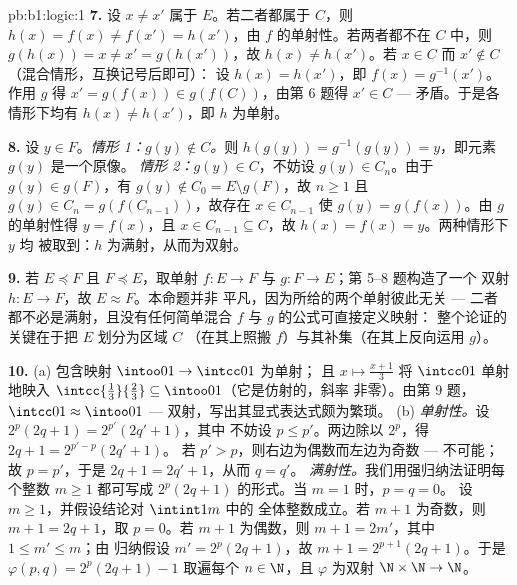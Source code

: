 \begin{solution}{pb:b1:logic:1}
\textbf{7.} 设 $x \neq x'$ 属于 $E$。若二者都属于 $C$，则 $h(x) =
f(x) \neq f(x') = h(x')$，由 $f$ 的单射性。若两者都不在
$C$ 中，则 $g(h(x)) = x \neq x' = g(h(x'))$，故 $h(x) \neq h(x')$。若
$x \in C$ 而 $x' \notin C$（混合情形，互换记号后即可）：
设 $h(x) = h(x')$，即 $f(x) = g^{-1}(x')$。作用 $g$ 得
$x' = g(f(x)) \in g(f(C))$，由第 6 题得 $x' \in C$ ---
矛盾。于是各情形下均有 $h(x) \neq h(x')$，即 $h$ 为单射。

\textbf{8.} 设 $y \in F$。\emph{情形 1：$g(y) \notin C$。}则
$h(g(y)) = g^{-1}(g(y)) = y$，即元素 $g(y)$ 是一个原像。
\emph{情形 2：$g(y) \in C$}，不妨设 $g(y) \in C_n$。由于 $g(y) \in
g(F)$，有 $g(y) \notin C_0 = E \setminus g(F)$，故 $n \geq 1$
且 $g(y) \in C_n = g(f(C_{n-1}))$，故存在 $x \in C_{n-1}$ 使
$g(y) = g(f(x))$。由 $g$ 的单射性得 $y = f(x)$，且 $x \in
C_{n-1} \subseteq C$，故 $h(x) = f(x) = y$。两种情形下 $y$ 均
被取到：$h$ 为满射，从而为双射。

\textbf{9.} 若 $E \preceq F$ 且 $F \preceq E$，取单射 $f
\colon E \to F$ 与 $g \colon F \to E$；第 5--8 题构造了一个
双射 $h \colon E \to F$，故 $E \approx F$。本命题并非
平凡，因为所给的两个单射彼此无关 --- 二者
都不必是满射，且没有任何简单混合 $f$ 与 $g$ 的公式可直接定义映射：
整个论证的关键在于把 $E$ 划分为区域 $C$
（在其上照搬 $f$）与其补集（在其上反向运用
$g$）。

\textbf{10.} (a) 包含映射 $\intoo01 \to \intcc01$ 为单射；
且 $x \mapsto \frac{x + 1}3$ 将 $\intcc01$ 单射地映入
$\intcc{\frac13}{\frac23} \subseteq \intoo01$（它是仿射的，斜率
非零）。由第 9 题，$\intcc01 \approx \intoo01$ ---
双射，写出其显式表达式颇为繁琐。
(b) \emph{单射性。}设 $2^p(2q + 1) = 2^{p'}(2q' + 1)$，其中
不妨设 $p \leq p'$。两边除以 $2^p$，得 $2q + 1 = 2^{p' - p}(2q' + 1)$。
若 $p' > p$，则右边为偶数而左边为奇数 ---
不可能；故 $p = p'$，于是 $2q + 1 = 2q' + 1$，从而 $q = q'$。
\emph{满射性。}我们用强归纳法证明每个整数
$m \geq 1$ 都可写成 $2^p(2q + 1)$ 的形式。当 $m = 1$ 时，$p = q = 0$。
设 $m \geq 1$，并假设结论对 $\intint1m$ 中的
全体整数成立。若 $m + 1$ 为奇数，则 $m + 1 = 2q + 1$，取 $p = 0$。若
$m + 1$ 为偶数，则 $m + 1 = 2m'$，其中 $1 \leq m' \leq m$；由
归纳假设 $m' = 2^p(2q + 1)$，故 $m + 1 = 2^{p+1}(2q + 1)$。于是
$\varphi(p, q) = 2^p(2q + 1) - 1$ 取遍每个 $n \in \N$，且
$\varphi$ 为双射 $\N \times \N \to \N$。


\end{solution}
